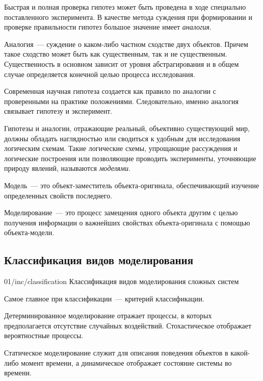 Быстрая и полная проверка гипотез может быть проведена в ходе специально поставленного эксперимента. В качестве метода суждения при формировании и проверке правильности гипотез большое значение имеет \textit{аналогия}.

\begin{dd}
    Аналогия~--- суждение о каком-либо частном сходстве двух объектов. Причем такое сходство может быть как существенным, так и не существенным. Существенность в основном зависит от уровня абстрагирования и в общем случае определяется конечной целью процесса исследования.
\end{dd}

Современная научная гипотеза создается как правило по аналогии с проверенными на практике положениями. Следовательно, именно аналогия связывает гипотезу и эксперимент.

Гипотезы и аналогии, отражающие реальный, объективно существующий мир, должны обладать наглядностью или сводиться к удобным для исследования логическим схемам. Такие логические схемы, упрощающие рассуждения и логические построения или позволяющие проводить эксперименты, уточняющие природу явлений, называются \textit{моделями}.

\begin{dd}
    Модель~--- это объект-заместитель объекта-оригинала, обеспечивающий изучение определенных свойств последнего.
\end{dd}

\begin{dd}
    Моделирование~--- это процесс замещения одного объекта другим с целью получения информации о важнейших свойствах объекта-оригинала с помощью объекта-модели.
\end{dd}

\subsection{Классификация видов моделирования}

\image
{\textwidth}
{01/inc/classification}
{Классификация видов моделирования сложных систем}

Самое главное при классификации~--- критерий классификации.

Детерминированное моделирование отражает процессы, в которых предполагается отсутствие случайных воздействий. Стохастическое отображает вероятностные процессы.

Статическое моделирование служит для описания поведения объектов в какой-либо момент времени, а динамическое отображает состояние системы во времени.

